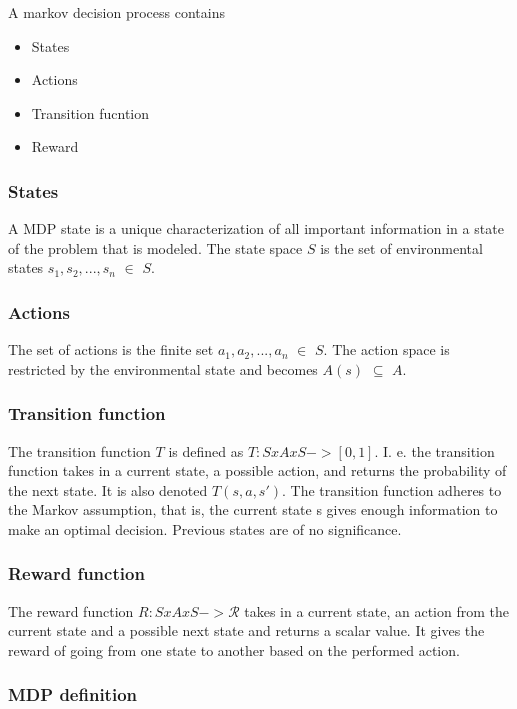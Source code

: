 A markov decision process contains
\begin{itemize}
    \item States
    \item Actions
    \item Transition fucntion
    \item Reward
\end{itemize}



\subsubsection{States}

A MDP state is a unique characterization of all important information in a state of the problem that is modeled. The state space $S$ is the set of environmental states ${s_1, s_2, ..., s_n}$ $\in$ $S$.

\subsubsection{Actions}

The set of actions is the finite set ${a_1, a_2, ..., a_n}$ $\in$ $S$. The action space is restricted by the environmental state and becomes $A(s)$ $\subseteq $ $A$.

\subsubsection{Transition function}

The transition function $T$ is defined as $T: S x A x S -> [0, 1]$. I. e. the transition function takes in a current state, a possible action, and returns the probability of the next state. It is also denoted $T(s, a, s')$.
The transition function adheres to the Markov assumption, that is, the current state s gives enough information to make an optimal decision. Previous states are of no significance.

\subsubsection{Reward function}

The reward function $R: S x A x S -> \mathcal{R}$ takes in a current state, an action from the current state and a possible next state and returns a scalar value. It gives the reward of going from one state to another based on the performed action.


\subsubsection{MDP definition}

